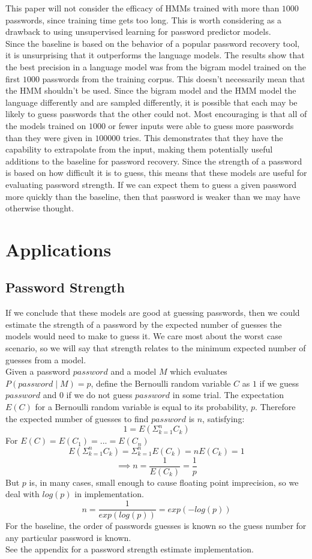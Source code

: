\documentclass{amsart}
\theoremstyle{definition}
\theoremstyle{remark}
\numberwithin{equation}{section}
\begin{document}
This paper will not consider the efficacy of HMMs trained with more than $1000$ passwords, since training time gets too long. This is worth considering as a drawback to using unsupervised learning for password predictor models.\\
Since the baseline is based on the behavior of a popular password recovery tool, it is unsurprising that it outperforms the language models. The results show that the best precision in a language model was from the bigram model trained on the first $1000$ passwords from the training corpus. This doesn't necessarily mean that the HMM shouldn't be used. Since the bigram model and the HMM model the language differently and are sampled differently, it is possible that each may be likely to guess passwords that the other could not. Most encouraging is that all of the models trained on $1000$ or fewer inputs were able to guess more passwords than they were given in $100000$ tries. This demonstrates that they have the capability to extrapolate from the input, making them potentially useful additions to the baseline for password recovery. Since the strength of a password is based on how difficult it is to guess, this means that these models are useful for evaluating password strength. If we can expect them to guess a given password more quickly than the baseline, then that password is weaker than we may have otherwise thought.

\section{Applications}
\subsection{Password Strength}
If we conclude that these models are good at guessing passwords, then we could estimate the strength of a password by the expected number of guesses the models would need to make to guess it. We care most about the worst case scenario, so we will say that strength relates to the minimum expected number of guesses from a model.\\
Given a password $password$ and a model $M$ which evaluates $P(password \mid M) = p$, define the Bernoulli random variable $C$ as $1$ if we guess $password$ and $0$ if we do not guess $password$ in some trial. The expectation $E(C)$ for a Bernoulli random variable is equal to its probability, $p$. Therefore the expected number of guesses to find $password$ is $n$, satisfying:\\
$$1 = E(\Sigma_{k = 1}^n C_k)$$
For $E(C) = E(C_1) = ... = E(C_n)$
$$E(\Sigma_{k = 1}^n C_k) = \Sigma_{k = 1}^n E(C_k) = nE(C_k) = 1$$
$$\implies n = \frac{1}{E(C_k)} = \frac{1}{p}$$
But $p$ is, in many cases, small enough to cause floating point imprecision, so we deal with $log(p)$ in implementation.
$$n = \frac{1}{exp(log(p))} = exp(-log(p))$$
For the baseline, the order of passwords guesses is known so the guess number for any particular password is known.\\
See the appendix for a password strength estimate implementation.\\
\end{document}
